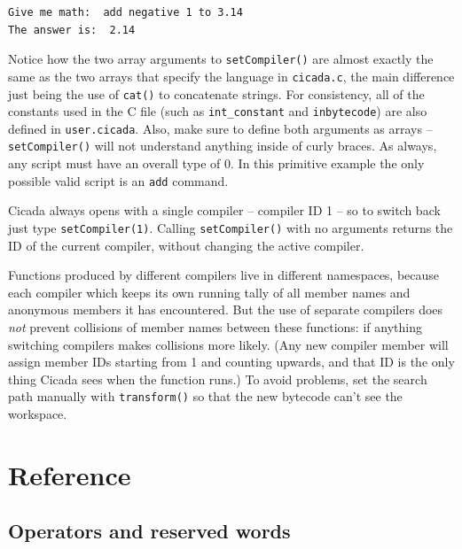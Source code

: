 \documentclass{article}
\newenvironment{code}{
       \begin{list}{}{
               \setlength{\leftmargin}{.4in}
               \setlength{\rightmargin}{0in}
               \setlength{\topsep}{.2in}
       }
       \small
       \item[] }
       { \end{list}   }
\begin{document}
\begin{code} \begin{verbatim}
Give me math:  add negative 1 to 3.14
The answer is:  2.14
\end{verbatim} \end{code}

\noindent Notice how the two array arguments to \verb#setCompiler()# are almost exactly the same as the two arrays that specify the language in \verb#cicada.c#, the main difference just being the use of \verb#cat()# to concatenate strings.  For consistency, all of the constants used in the C file (such as \verb#int_constant# and \verb#inbytecode#) are also defined in \verb#user.cicada#.  Also, make sure to define both arguments as arrays -- \verb#setCompiler()# will not understand anything inside of curly braces.  As always, any script must have an overall type of 0.  In this primitive example the only possible valid script is an \verb#add# command.

Cicada always opens with a single compiler -- compiler ID 1 -- so to switch back just type \verb#setCompiler(1)#.  Calling \verb#setCompiler()# with no arguments returns the ID of the current compiler, without changing the active compiler.

Functions produced by different compilers live in different namespaces, because each compiler which keeps its own running tally of all member names and anonymous members it has encountered.  But the use of separate compilers does \emph{not} prevent collisions of member names between these functions:  if anything switching compilers makes collisions more likely.  (Any new compiler member will assign member IDs starting from 1 and counting upwards, and that ID is the only thing Cicada sees when the function runs.)  To avoid problems, set the search path manually with \verb#transform()# so that the new bytecode can't see the workspace.


\newpage



\section{Reference}




\subsection{Operators and reserved words}   
\end{document}
